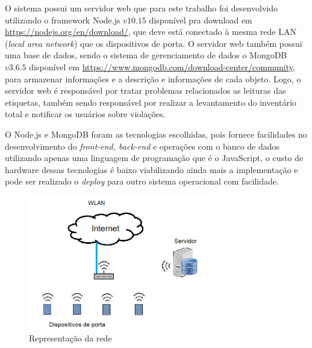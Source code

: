 \par
O sistema possui um servidor web que para este trabalho foi desenvolvido utilizando o framework Node.js $v10.15$ disponível pra download em \url{https://nodejs.org/en/download/}, que deve está conectado à mesma rede LAN (\textit{local area network}) que os dispositivos de porta. O servidor web também possui uma base de dados, sendo o sistema de gerenciamento de dados o MongoDB $v3.6.5$ disponível em \url{https://www.mongodb.com/download-center/community}, para armazenar informações e a descrição e informações de cada objeto. Logo, o servidor web é responsável por tratar problemas relacionados as leituras das  etiquetas, também sendo responsável por realizar a levantamento do inventário total e notificar os usuários sobre violações.

\par
O Node.js e MongoDB foram as tecnologias escolhidas, pois fornece facilidades no desenvolvimento do \textit{front-end, back-end} e operações com o banco de dados utilizando apenas uma linguagem de programação que é o JavaScript, o custo de hardware dessas tecnologias é baixo viabilizando ainda mais a implementação e pode ser realizado o \textit{deploy} para outro sistema operacional com facilidade.


\begin{figure}[H]
              \caption{\label{fig:representacao_rede}{Representação da rede}}
              \centering
              \includegraphics[width=0.7\textwidth]{Figuras/rede.png}
\end{figure}

